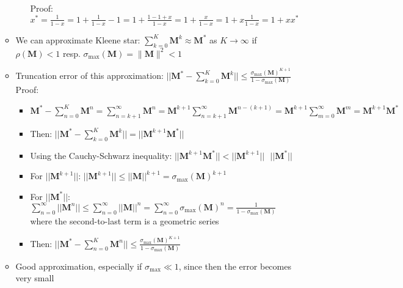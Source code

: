 \begin{itemize}
\begin{itemize}
\begin{itemize}
            Proof:
            $
            x^* = \frac{1}{1 - x} = 1 + \frac{1}{1 - x} -1 = 1 + \frac{1 - 1 + x}{1 - x} = 1 + \frac{x}{1 - x} = 1 + x \frac{1}{1 - x} = 1 + x x^*
            $
        \end{itemize}
        \item We can approximate Kleene star:
        $
        \sum_{k=0}^{K} \boldsymbol{M}^k \approx \boldsymbol{M}^*$ as $K \to \infty$ if $\rho(\boldsymbol{M}) < 1$ resp. $\sigma_{\max}(\boldsymbol{M}) = \| \boldsymbol{M} \|^2 < 1
        $
        \item Truncation error of this approximation:
        $
        || \boldsymbol{M}^* - \sum_{k=0}^K \boldsymbol{M}^k || \leq \frac{\sigma_{\max}(\boldsymbol{M})^{K+1}}{1 - \sigma_{\max}(\boldsymbol{M})}
        $\\
        Proof:
        \begin{itemize}
            \item $\boldsymbol{M}^* - \sum_{n=0}^K \boldsymbol{M}^n = \sum_{n=k+1}^\infty \boldsymbol{M}^n = \boldsymbol{M}^{k+1} \sum_{n=k+1}^\infty \boldsymbol{M}^{n-(k+1)} = \boldsymbol{M}^{k+1} \sum_{m=0}^\infty \boldsymbol{M}^m = \boldsymbol{M}^{k+1} \boldsymbol{M}^*$
            \item Then:
            $
            || \boldsymbol{M}^* - \sum_{k=0}^K \boldsymbol{M}^k || = || \boldsymbol{M}^{k+1} \boldsymbol{M}^* ||
            $
            \item Using the Cauchy-Schwarz inequality:
            $
            || \boldsymbol{M}^{k+1} \boldsymbol{M}^* || < || \boldsymbol{M}^{k+1} || \textrm{ } || \boldsymbol{M}^* ||
            $
            \item For $|| \boldsymbol{M}^{k+1} ||$:
            $
            || \boldsymbol{M}^{k+1} || \leq || \boldsymbol{M} ||^{k+1} = \sigma_{\max}(\boldsymbol{M})^{k+1}
            $
            \item For $|| \boldsymbol{M}^* ||$:
            $
            \sum_{n=0}^\infty || \boldsymbol{M}^n || \leq \sum_{n=0}^\infty || \boldsymbol{M} ||^n = \sum_{n=0}^\infty \sigma_{\max}(\boldsymbol{M})^n = \frac{1}{1 - \sigma_{\max}(\boldsymbol{M})}
            $ where the second-to-last term is a geometric series
            \item Then: $
            || \boldsymbol{M}^* - \sum_{n=0}^K \boldsymbol{M}^n || \leq \frac{\sigma_{\max}(\boldsymbol{M})^{K+1}}{1 - \sigma_{\max}(\boldsymbol{M})}
            $
        \end{itemize}
        \item Good approximation, especially if $\sigma_{\max} \ll 1$, since then the error becomes very small

\end{itemize}
\end{itemize}
